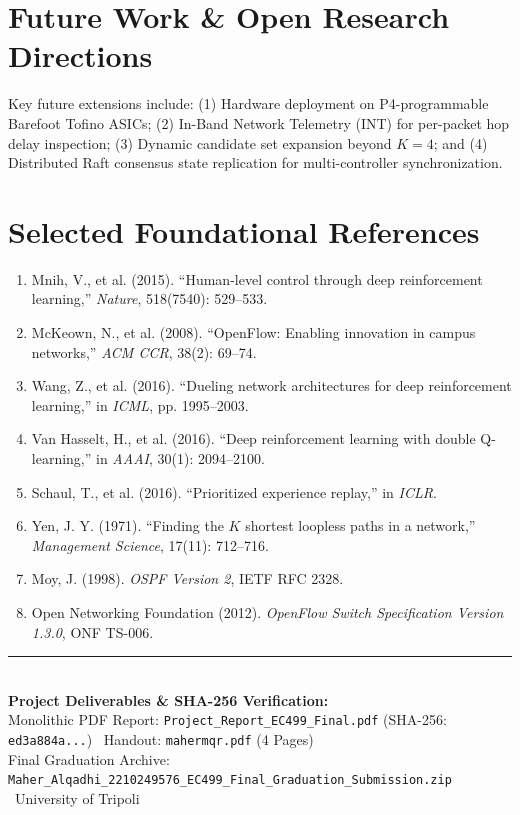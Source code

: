 \documentclass[10pt,a4paper]{article}
\begin{document}
\section{Future Work \& Open Research Directions}
\footnotesize
Key future extensions include: (1) Hardware deployment on P4-programmable Barefoot Tofino ASICs; (2) In-Band Network Telemetry (INT) for per-packet hop delay inspection; (3) Dynamic candidate set expansion beyond $K=4$; and (4) Distributed Raft consensus state replication for multi-controller synchronization.

\section{Selected Foundational References}
\scriptsize
\begin{enumerate}[noitemsep,leftmargin=*,itemsep=0.5pt]
  \item Mnih, V., et al. (2015). ``Human-level control through deep reinforcement learning,'' \emph{Nature}, 518(7540): 529--533.
  \item McKeown, N., et al. (2008). ``OpenFlow: Enabling innovation in campus networks,'' \emph{ACM CCR}, 38(2): 69--74.
  \item Wang, Z., et al. (2016). ``Dueling network architectures for deep reinforcement learning,'' in \emph{ICML}, pp. 1995--2003.
  \item Van Hasselt, H., et al. (2016). ``Deep reinforcement learning with double Q-learning,'' in \emph{AAAI}, 30(1): 2094--2100.
  \item Schaul, T., et al. (2016). ``Prioritized experience replay,'' in \emph{ICLR}.
  \item Yen, J. Y. (1971). ``Finding the $K$ shortest loopless paths in a network,'' \emph{Management Science}, 17(11): 712--716.
  \item Moy, J. (1998). \emph{OSPF Version 2}, IETF RFC 2328.
  \item Open Networking Foundation (2012). \emph{OpenFlow Switch Specification Version 1.3.0}, ONF TS-006.
\end{enumerate}

\vspace{1mm}
\begin{center}
\rule{0.6\textwidth}{0.4pt}\\[1mm]
{\scriptsize\textbf{Project Deliverables \& SHA-256 Verification:}}\\
{\tiny Monolithic PDF Report: \texttt{Project\_Report\_EC499\_Final.pdf} (SHA-256: \texttt{ed3a884a...}) \textbar\ Handout: \texttt{mahermqr.pdf} (4 Pages)}\\
{\tiny Final Graduation Archive: \texttt{Maher\_Alqadhi\_2210249576\_EC499\_Final\_Graduation\_Submission.zip} \textbar\ University of Tripoli}
\end{center}
\end{document}
